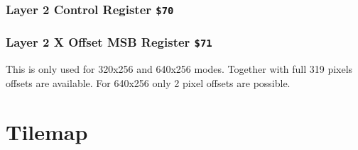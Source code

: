 \documentclass[12pt,twoside,openright,a4paper]{book}
\begin{document}
\subsubsection{Layer 2 Control Register {\tt \$70}}

\begin{NextPort}
\end{NextPort}


\subsubsection{Layer 2 X Offset MSB Register {\tt \$71}}

\begin{NextPort}
\end{NextPort}

This is only used for 320x256 and 640x256 modes. Together with  full 319 pixels offsets are available. For 640x256 only 2 pixel offsets are possible.


\pagebreak
\section{Tilemap}

\end{document}
